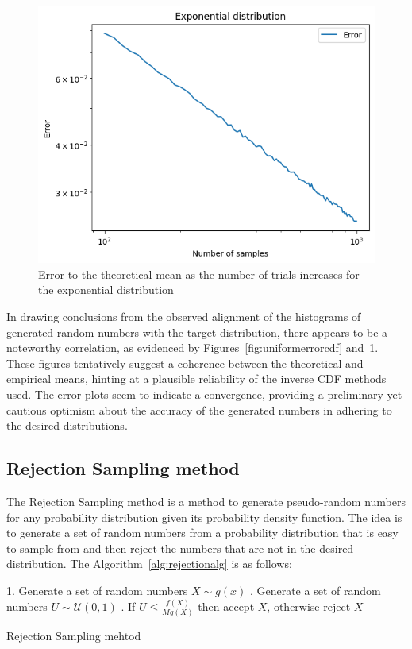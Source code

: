 \documentclass{article}
\begin{document}
\begin{figure}[H]
	\centering
	\includegraphics[width=0.5\linewidth]{./Figures/InverseCDF/exponential_error.png}
	\caption{Error to the theoretical mean as the number of trials increases for the exponential distribution}
	\label{fig:exponentialerrorcdf}
\end{figure}

In drawing conclusions from the observed alignment of the histograms of generated random numbers with the target distribution, there appears to be a noteworthy correlation, as evidenced by Figures~\ref{fig:uniformerrorcdf} and~\ref{fig:exponentialerrorcdf}. These figures tentatively suggest a coherence between the theoretical and empirical means, hinting at a plausible reliability of the inverse CDF methods used. The error plots seem to indicate a convergence, providing a preliminary yet cautious optimism about the accuracy of the generated numbers in adhering to the desired distributions.



\subsection{Rejection Sampling method}

The Rejection Sampling method is a method to generate pseudo-random numbers for any probability distribution given its probability density function. The idea is to generate a set of random numbers from a probability distribution that is easy to sample from and then reject the numbers that are not in the desired distribution. The Algorithm~\ref{alg:rejectionalg} is as follows:

\begin{center}
	\begin{minipage}{0.7\linewidth} %
		\begin{algorithm}[H]
			1. Generate a set of random numbers \(X \sim g(x)\) . Generate a set of random numbers \(U \sim \mathcal{U}(0,1)\) . If \(U \leq \frac{f(X)}{Mg(X)}\) then accept \(X\), otherwise reject \(X\) \;
			\caption{Rejection Sampling mehtod} %
			\label{alg:rejectionalg}   %
		\end{algorithm}
	\end{minipage}
\end{center}
\end{document}
